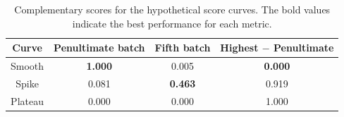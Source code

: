 \begin{table}
    \centering
    \caption{Complementary scores for the hypothetical score curves. The bold values indicate the best performance for each metric.}
    \begin{tabular}{|c|c|c|c|}
        \hline
        Curve & Penultimate batch & Fifth batch & Highest $-$ Penultimate \\
        \hline
        Smooth & \textbf{1.000} & 0.005 & \textbf{0.000} \\
        Spike & 0.081 & \textbf{0.463} & 0.919 \\
        Plateau & 0.000 & 0.000 & 1.000 \\
        \hline
    \end{tabular}
    \label{tab:complementary_scores_on_the_hypotheticals}
\end{table}
